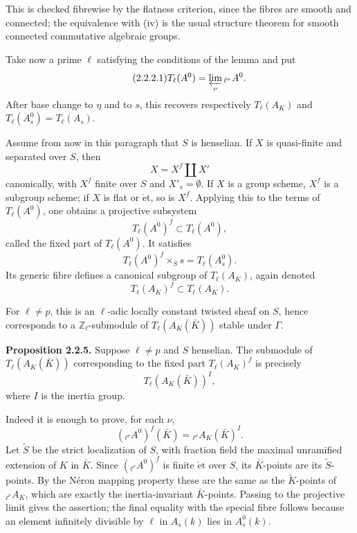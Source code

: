 \documentclass[11pt]{article}
\providecommand{\Z}{\mathbb Z}
\providecommand{\etale}{\mathrm{\acute et}}
\begin{document}
This is checked fibrewise by the flatness criterion, since the fibres are smooth and connected; the equivalence with (iv) is the usual structure theorem for smooth connected commutative algebraic groups.

Take now a prime \(\ell\) satisfying the conditions of the lemma and put
\begin{equation}\tag{2.2.2.1}
 T_\ell(A^0)=\varprojlim_\nu {}_{\ell^\nu}A^0.
\end{equation}
After base change to \(\eta\) and to \(s\), this recovers respectively \(T_\ell(A_K)\) and \(T_\ell(A_s^0)=T_\ell(A_s)\).

Assume from now in this paragraph that \(S\) is henselian.  If \(X\) is quasi-finite and separated over \(S\), then
\begin{equation}\tag{2.2.3.1}
 X=X^f\amalg X'
\end{equation}
canonically, with \(X^f\) finite over \(S\) and \(X'_s=\emptyset\).  If \(X\) is a group scheme, \(X^f\) is a subgroup scheme; if \(X\) is flat or \(\etale\), so is \(X^f\).  Applying this to the terms of \(T_\ell(A^0)\), one obtains a projective subsystem
\begin{equation}\tag{2.2.3.2}
 T_\ell(A^0)^f\subset T_\ell(A^0),
\end{equation}
called the fixed part of \(T_\ell(A^0)\).  It satisfies
\begin{equation}\tag{2.2.3.3}
 T_\ell(A^0)^f\times_S s = T_\ell(A_s^0).
\end{equation}
Its generic fibre defines a canonical subgroup of \(T_\ell(A_K)\), again denoted
\begin{equation}\tag{2.2.3.4}
 T_\ell(A_K)^f\subset T_\ell(A_K).
\end{equation}

For \(\ell\ne p\), this is an \(\ell\)-adic locally constant twisted sheaf on \(S\), hence corresponds to a \(\Z_\ell\)-submodule of \(T_\ell(A_K(\bar K))\) stable under \(\Gamma\).

\textbf{Proposition 2.2.5.}  Suppose \(\ell\ne p\) and \(S\) henselian.  The submodule of \(T_\ell(A_K(\bar K))\) corresponding to the fixed part \(T_\ell(A_K)^f\) is precisely
\begin{equation}\tag{2.2.5}
 T_\ell(A_K(\bar K))^I,
\end{equation}
where \(I\) is the inertia group.

Indeed it is enough to prove, for each \(\nu\),
\begin{equation}\tag{2.2.5.0}
 ({}_{\ell^\nu}A^0)^f(\bar K)={}_{\ell^\nu}A_K(\bar K)^I.
\end{equation}
Let \(\widetilde S\) be the strict localization of \(S\), with fraction field the maximal unramified extension of \(K\) in \(\bar K\).  Since \(({}_{\ell^\nu}A^0)^f\) is finite \(\etale\) over \(S\), its \(\bar K\)-points are its \(\widetilde S\)-points.  By the N\'eron mapping property these are the same as the \(\widetilde K\)-points of \({}_{\ell^\nu}A_K\), which are exactly the inertia-invariant \(\bar K\)-points.  Passing to the projective limit gives the assertion; the final equality with the special fibre follows because an element infinitely divisible by \(\ell\) in \(A_s(k)\) lies in \(A_s^0(k)\).
\end{document}
